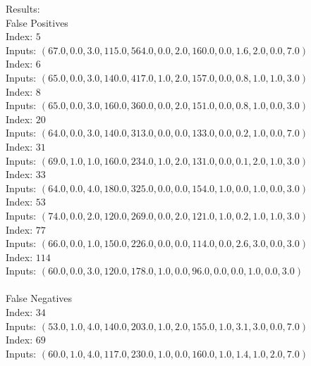 \begin{enumerate}
\begin{enumerate}
					Results: \\
					\textnormal{False Positives } \\
					\textnormal{Index: } \( 5 \) \\
					\textnormal{Inputs: } \( (67.0, 0.0, 3.0, 115.0, 564.0, 0.0, 2.0, 160.0, 0.0, 1.6, 2.0, 0.0, 7.0) \) \\
					\textnormal{Index: } \( 6 \) \\
					\textnormal{Inputs: } \( (65.0, 0.0, 3.0, 140.0, 417.0, 1.0, 2.0, 157.0, 0.0, 0.8, 1.0, 1.0, 3.0) \) \\
					\textnormal{Index: } \( 8 \) \\
					\textnormal{Inputs: } \( (65.0, 0.0, 3.0, 160.0, 360.0, 0.0, 2.0, 151.0, 0.0, 0.8, 1.0, 0.0, 3.0) \) \\
					\textnormal{Index: } \( 20 \) \\
					\textnormal{Inputs: } \( (64.0, 0.0, 3.0, 140.0, 313.0, 0.0, 0.0, 133.0, 0.0, 0.2, 1.0, 0.0, 7.0) \) \\
					\textnormal{Index: } \( 31 \) \\
					\textnormal{Inputs: } \( (69.0, 1.0, 1.0, 160.0, 234.0, 1.0, 2.0, 131.0, 0.0, 0.1, 2.0, 1.0, 3.0) \) \\
					\textnormal{Index: } \( 33 \) \\
					\textnormal{Inputs: } \( (64.0, 0.0, 4.0, 180.0, 325.0, 0.0, 0.0, 154.0, 1.0, 0.0, 1.0, 0.0, 3.0) \) \\
					\textnormal{Index: } \( 53 \) \\
					\textnormal{Inputs: } \( (74.0, 0.0, 2.0, 120.0, 269.0, 0.0, 2.0, 121.0, 1.0, 0.2, 1.0, 1.0, 3.0) \) \\
					\textnormal{Index: } \( 77 \) \\
					\textnormal{Inputs: } \( (66.0, 0.0, 1.0, 150.0, 226.0, 0.0, 0.0, 114.0, 0.0, 2.6, 3.0, 0.0, 3.0) \) \\
					\textnormal{Index: } \( 114 \) \\
					\textnormal{Inputs: } \( (60.0, 0.0, 3.0, 120.0, 178.0, 1.0, 0.0, 96.0, 0.0, 0.0, 1.0, 0.0, 3.0) \) \\ \\
										
					\textnormal{False Negatives} \\
					\textnormal{Index: } \( 34 \) \\
					\textnormal{Inputs: } \( (53.0, 1.0, 4.0, 140.0, 203.0, 1.0, 2.0, 155.0, 1.0, 3.1, 3.0, 0.0, 7.0) \) \\
					\textnormal{Index: } \( 69 \) \\
					\textnormal{Inputs: } \( (60.0, 1.0, 4.0, 117.0, 230.0, 1.0, 0.0, 160.0, 1.0, 1.4, 1.0, 2.0, 7.0) \) \\ \\
					

\end{enumerate}
\end{enumerate}
